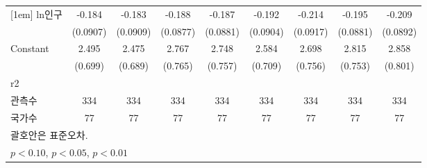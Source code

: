 \begin{table}[htbp]
{\begin{tabular}{l*{8}{c}}
[1em]
ln인구            &      -0.184\sym{**} &      -0.183\sym{**} &      -0.188\sym{**} &      -0.187\sym{**} &      -0.192\sym{**} &      -0.214\sym{**} &      -0.195\sym{**} &      -0.209\sym{**} \\
                    &    (0.0907)         &    (0.0909)         &    (0.0877)         &    (0.0881)         &    (0.0904)         &    (0.0917)         &    (0.0881)         &    (0.0892)         \\
[1em]
Constant            &       2.495\sym{***}&       2.475\sym{***}&       2.767\sym{***}&       2.748\sym{***}&       2.584\sym{***}&       2.698\sym{***}&       2.815\sym{***}&       2.858\sym{***}\\
                    &     (0.699)         &     (0.689)         &     (0.765)         &     (0.757)         &     (0.709)         &     (0.756)         &     (0.753)         &     (0.801)         \\
\hline
r2                  &                     &                     &                     &                     &                     &                     &                     &                     \\
관측수                   &         334         &         334         &         334         &         334         &         334         &         334         &         334         &         334         \\
국가수                 &          77         &          77         &          77         &          77         &          77         &          77         &          77         &          77         \\
\hline\hline
\multicolumn{9}{l}{\footnotesize  괄호안은 표준오차.}\\
\multicolumn{9}{l}{\footnotesize \sym{*} \(p<0.10\), \sym{**} \(p<0.05\), \sym{***} \(p<0.01\)}\\
\end{tabular}}
\end{table}
